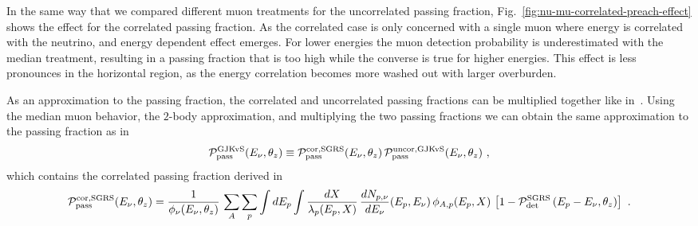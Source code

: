 In the same way that we compared different muon treatments for the uncorrelated passing fraction, Fig.~\ref{fig:nu-mu-correlated-preach-effect} shows the effect for the correlated passing fraction.
As the correlated case is only concerned with a single muon where energy is correlated with the neutrino, and energy dependent effect emerges.
For lower energies the muon detection probability is underestimated with the median treatment, resulting in a passing fraction that is too high while the converse is true for higher energies.
This effect is less pronounces in the horizontal region, as the energy correlation becomes more washed out with larger overburden.

As an approximation to the passing fraction, the correlated and uncorrelated passing fractions can be multiplied together like in~\cite{Gaisser:2014bja}.
Using the median muon behavior, the $2$-body approximation, and multiplying the two passing fractions we can obtain the same approximation to the passing fraction as in~\cite{Gaisser:2014bja}
\begin{equation}
\label{eq:PGJKvS}
{\cal P}_{\rm pass}^{\rm GJKvS} (E_\nu, \theta_z) \equiv {\cal P}_{\rm pass}^{\rm cor, SGRS}(E_\nu, \theta_z) \, {\cal P}_{\rm pass}^{\rm uncor, GJKvS}(E_\nu, \theta_z) ~,
\end{equation}
which contains the correlated passing fraction derived in~\cite{Schonert:2008is}
\begin{equation}
\label{eq:PcorSGRS}
{\cal P}_{\rm pass}^{\rm cor, SGRS}(E_\nu, \theta_z) = \frac{1}{\phi_\nu(E_\nu, \theta_z)} \, \sum_A \sum_{p} \int dE_p  \int \frac{dX}{\lambda_p(E_p, X)} \, \frac{dN_{p, \nu}}{dE_\nu}(E_p, E_\nu) \, \phi_{A, p}(E_p, X) \,
\left[1 - {\cal P}_{\rm det}^{\rm SGRS}\left(E_p-E_\nu , \theta_z\right)\right]~.
\end{equation}


